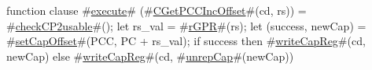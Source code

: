 function clause #\hyperref[zexecute]{execute}# (#\hyperref[zCGetPCCIncOffset]{CGetPCCIncOffset}#(cd, rs)) =
{
  #\hyperref[zcheckCP2usable]{checkCP2usable}#();
  let rs_val = #\hyperref[zrGPR]{rGPR}#(rs);
  let (success, newCap) = #\hyperref[zsetCapOffset]{setCapOffset}#(PCC, PC + rs_val);
  if success then
      #\hyperref[zwriteCapReg]{writeCapReg}#(cd, newCap)
  else
      #\hyperref[zwriteCapReg]{writeCapReg}#(cd, #\hyperref[zunrepCap]{unrepCap}#(newCap))
}
